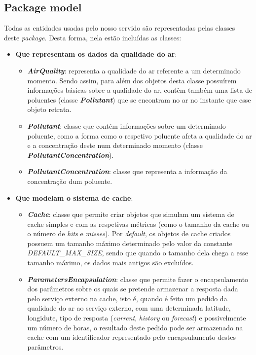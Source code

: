 \subsection{Package model}
Todas as entidades usadas pelo nosso servido são representadas pelas classes deste \textit{package}. Desta forma, nela estão incluídas as classes:
\begin{itemize}
   \item \textbf{Que representam os dados da qualidade do ar}: 
      \begin{itemize}
         \item \textbf{\textit{AirQuality}}: representa a qualidade do ar referente a um determinado momento. Sendo assim, para além dos objetos desta classe possuírem informações básicas sobre a qualidade do ar, contêm também uma lista de poluentes (classe \textbf{\textit{Pollutant}}) que se encontram no ar no instante que esse objeto retrata.
         \item \textbf{\textit{Pollutant}}: classe que contém informações sobre um determinado poluente, como a forma como o respetivo poluente afeta a qualidade do ar e a concentração deste num determinado momento (classe \textbf{\textit{PollutantConcentration}}).
         \item \textbf{\textit{PollutantConcentration}}: classe que representa a informação da concentração dum poluente.
      \end{itemize}
   \item \textbf{Que modelam o sistema de cache}:
      \begin{itemize}
         \item \textbf{\textit{Cache}}: classe que permite criar objetos que simulam um sistema de cache simples e com as respetivas métricas (como o tamanho da cache ou o número de \textit{hits} e \textit{misses}). Por \textit{default}, os objetos de cache criados possuem um tamanho máximo determinado pelo valor da constante \textit{DEFAULT\_MAX\_SIZE}, sendo que quando o tamanho dela chega a esse tamanho máximo, os dados mais antigos são excluídos.
         \item \textbf{\textit{ParametersEncapsulation}}: classe que permite fazer o encapsulamento dos parâmetros sobre os quais se pretende armazenar a resposta dada pelo serviço externo na cache, isto é, quando é feito um pedido da qualidade do ar ao serviço externo, com uma determinada latitude, longidute, tipo de resposta (\textit{current}, \textit{history} ou \textit{forecast}) e possivelmente um número de horas, o resultado deste pedido pode ser armazenado na cache com um identificador representado pelo encapsulamento destes parâmetros.

\end{itemize}
\end{itemize}
